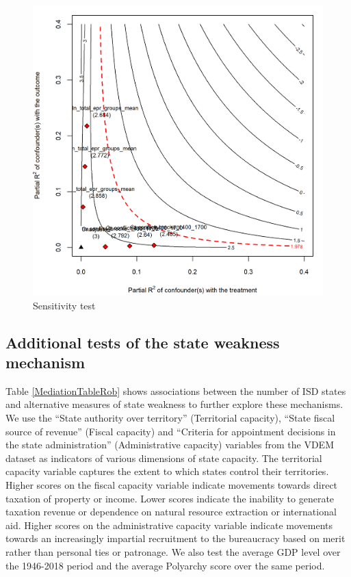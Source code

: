 \begin{figure}[!htb]
	\includegraphics[width=\textwidth]{img/hse_sens_main.png}
	\caption{Sensitivity test} 
	\label{Fig: Sens} 
\end{figure}

\subsection{Additional tests of the state weakness mechanism}

Table \ref{MediationTableRob} shows associations between the number of ISD states and
alternative measures of state weakness to further explore these mechanisms. We
use the ``State authority over territory'' (Territorial capacity), ``State fiscal
source of revenue'' (Fiscal capacity) and ``Criteria for appointment decisions in
the state administration'' (Administrative capacity) variables from the VDEM
dataset \citep{Coppedge2021} as indicators of various dimensions of state
capacity. The territorial capacity variable captures the extent to which states
control their territories. Higher scores on the fiscal capacity variable
indicate movements towards direct taxation of property or income. Lower scores
indicate the inability to generate taxation revenue or dependence on natural
resource extraction or international aid. Higher scores on the administrative
capacity variable indicate movements towards an increasingly impartial
recruitment to the bureaucracy based on merit rather than personal ties or
patronage. We also test the average GDP level over the 1946-2018 period and the
average Polyarchy score over the same period.   

